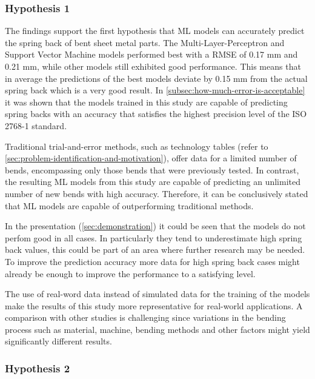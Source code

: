 \subsubsection{Hypothesis 1}
The findings support the first hypothesis that \ac{ML} models can accurately predict the spring back of bent sheet
metal parts.
The  Multi-Layer-Perceptron and Support Vector Machine models performed best with a RMSE of 0.17 mm and 0.21 mm, while
other models
still exhibited good performance.
This means that in average the predictions of the best models deviate by 0.15 mm from the actual spring back which is
a very good result.
In \cref{subsec:how-much-error-is-acceptable} it was shown that the models trained in this study are
capable of predicting spring backs with an accuracy that satisfies the highest precision level of the ISO 2768-1
standard.

Traditional trial-and-error methods, such as technology tables (refer to
\cref{sec:problem-identification-and-motivation}), offer data for a limited number of bends, encompassing
only those bends that were previously tested.
In contrast, the resulting \ac{ML} models from this study are capable of predicting an unlimited number of new bends
with high accuracy.
Therefore, it can be conclusively stated that \ac{ML} models are capable of outperforming traditional methods.

In the presentation (\cref{sec:demonstration}) it could be seen that the models do not perfom good in all cases.
In particularly they tend to underestimate high spring back values, this could be part of an area where further
research
may be needed.
To improve the prediction accuracy more data for high spring back cases might already be enough to improve the
performance to a satisfying level.

The use of real-word data instead of simulated data for the training of the models make the results of this study
more representative for real-world applications.
A comparison with other studies is challenging since variations in the bending process such as material, machine,
bending methods and other factors might yield significantly different results.

\subsubsection{Hypothesis 2}

